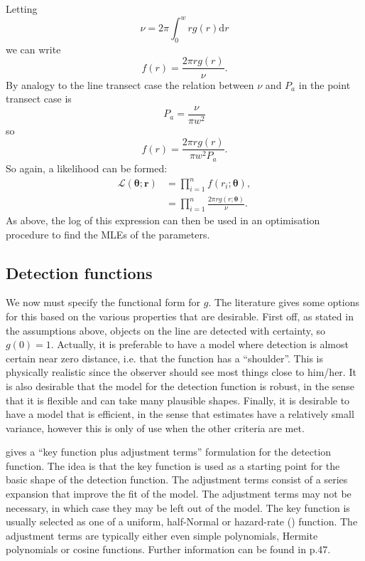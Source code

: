 Letting 
\begin{equation}
\nu = 2 \pi \int_0^w r g(r) \text{d}r
\end{equation}
we can write
\begin{equation}
f(r) = \frac{2 \pi r g(r)}{\nu}.
\end{equation}
By analogy to the line transect case the relation between $\nu$ and $P_a$ in the point transect case is
\begin{equation}
P_a=\frac{\nu}{\pi w^2}
\end{equation}
so
\begin{equation}
f(r) = \frac{2 \pi r g(r)}{\pi w^2 P_a}.
\end{equation}
So again, a likelihood can be formed:
\begin{align}
\mathcal{L}(\bm{\theta}; \bm{r}) &= \prod_{i=1}^n f(r_i;\bm{\theta}),\\
&= \prod_{i=1}^n \frac{2 \pi r g(r;\bm{\theta})}{\nu}.
\end{align}
As above, the log of this expression can then be used in an optimisation procedure to find the MLEs of the parameters.

\subsection{Detection functions}
We now must specify the functional form for $g$. The literature gives some options for this based on the various properties that are desirable. First off, as stated in the assumptions above, objects on the line are detected with certainty, so $g(0)=1$. Actually, it is preferable to have a model where detection is almost certain near zero distance, i.e. that the function has a ``shoulder''. This is physically realistic since the observer should see most things close to him/her. It is also desirable that the model for the detection function is robust, in the sense that it is flexible and can take many plausible shapes. Finally, it is desirable to have a model that is efficient, in the sense that estimates have a relatively small variance, however this is only of use when the other criteria are met.

\cite{buckland92} gives a ``key function plus adjustment terms'' formulation for the detection function. The idea is that the key function is used as a starting point for the basic shape of the detection function. The adjustment terms consist of a series expansion that improve the fit of the model. The adjustment terms may not be necessary, in which case they may be left out of the model. The key function is usually selected as one of a uniform, half-Normal or hazard-rate (\cite{buckland85}) function. The adjustment terms are typically either even simple polynomials, Hermite polynomials or cosine functions. Further information can be found in \cite{IDS} p.47.

